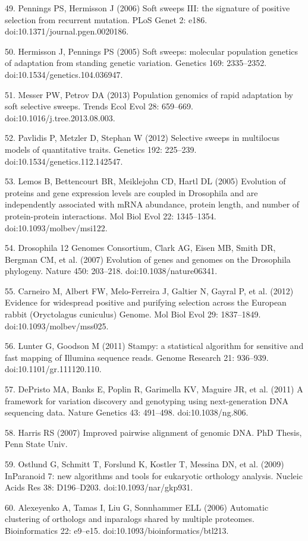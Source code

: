 49.	Pennings PS, Hermisson J (2006) Soft sweeps III: the signature of positive selection from recurrent mutation. PLoS Genet 2: e186. doi:10.1371/journal.pgen.0020186.

50.	Hermisson J, Pennings PS (2005) Soft sweeps: molecular population genetics of adaptation from standing genetic variation. Genetics 169: 2335–2352. doi:10.1534/genetics.104.036947.

51.	Messer PW, Petrov DA (2013) Population genomics of rapid adaptation by soft selective sweeps. Trends Ecol Evol 28: 659–669. doi:10.1016/j.tree.2013.08.003.

52.	Pavlidis P, Metzler D, Stephan W (2012) Selective sweeps in multilocus models of quantitative traits. Genetics 192: 225–239. doi:10.1534/genetics.112.142547.

53.	Lemos B, Bettencourt BR, Meiklejohn CD, Hartl DL (2005) Evolution of proteins and gene expression levels are coupled in Drosophila and are independently associated with mRNA abundance, protein length, and number of protein-protein interactions. Mol Biol Evol 22: 1345–1354. doi:10.1093/molbev/msi122.

54.	Drosophila 12 Genomes Consortium, Clark AG, Eisen MB, Smith DR, Bergman CM, et al. (2007) Evolution of genes and genomes on the Drosophila phylogeny. Nature 450: 203–218. doi:10.1038/nature06341.

55.	Carneiro M, Albert FW, Melo-Ferreira J, Galtier N, Gayral P, et al. (2012) Evidence for widespread positive and purifying selection across the European rabbit (Oryctolagus cuniculus) Genome. Mol Biol Evol 29: 1837–1849. doi:10.1093/molbev/mss025.

56.	Lunter G, Goodson M (2011) Stampy: a statistical algorithm for sensitive and fast mapping of Illumina sequence reads. Genome Research 21: 936–939. doi:10.1101/gr.111120.110.

57.	DePristo MA, Banks E, Poplin R, Garimella KV, Maguire JR, et al. (2011) A framework for variation discovery and genotyping using next-generation DNA sequencing data. Nature Genetics 43: 491–498. doi:10.1038/ng.806.

58.	Harris RS (2007) Improved pairwise alignment of genomic DNA. PhD Thesis, Penn State Univ.

59.	Ostlund G, Schmitt T, Forslund K, Kostler T, Messina DN, et al. (2009) InParanoid 7: new algorithms and tools for eukaryotic orthology analysis. Nucleic Acids Res 38: D196–D203. doi:10.1093/nar/gkp931.

60.	Alexeyenko A, Tamas I, Liu G, Sonnhammer ELL (2006) Automatic clustering of orthologs and inparalogs shared by multiple proteomes. Bioinformatics 22: e9–e15. doi:10.1093/bioinformatics/btl213.

